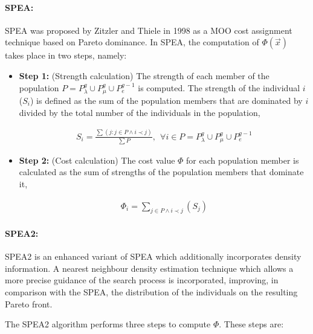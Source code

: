 \paragraph{SPEA:}
SPEA was proposed by Zitzler and Thiele \cite{ZiTh98} in 1998 as a MOO cost assignment technique based on Pareto dominance. In SPEA, the computation of $\Phi(\vec{x})$ takes place in two steps, namely:
\begin{itemize}

\item[]{\bf Step 1:}  (Strength calculation) The strength of each member of the population $P=P_{\lambda}^g \cup P_{\mu}^g \cup P_{e}^{g-1}$ is computed. The strength of the individual $i$ ($S_i$) is defined as the sum of the population members that are dominated  by $i$ divided by the total number of the individuals in the population,  

\begin{eqnarray}
	S_i = \frac{\sum(j : j \in P \wedge i \prec j)} {\sum P}, ~~ \forall i \in P =P_{\lambda}^g \cup P_{\mu}^g \cup P_{e}^{g-1}  
\end{eqnarray}

\item[]{\bf Step 2:}  (Cost calculation) The cost value $\Phi$ for each population member is calculated as the sum of strengths of the population members that dominate it,

\begin{eqnarray}
	\Phi_i = \sum _{j \in P \wedge i \prec j}(S_j)
\end{eqnarray}
\end{itemize}
  
 
\paragraph{SPEA2:}
SPEA2 \cite{Zitz02,Zitz01} is an enhanced variant of SPEA which additionally incorporates density information. A nearest neighbour density estimation technique which allows a more precise guidance of the search process is incorporated, improving, in comparison with the SPEA, the distribution of the individuals on the resulting Pareto front. 

The SPEA2 algorithm performs three steps to compute $\Phi$. These steps are:


